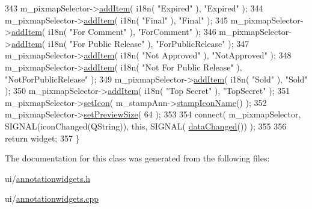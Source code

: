 \begin{DoxyCode}
343     m\_pixmapSelector->\hyperlink{classPixmapPreviewSelector_ac4729c46cc585aba462dd2eebcb74a92}{addItem}( i18n( \textcolor{stringliteral}{"Expired"} ), \textcolor{stringliteral}{"Expired"} );
344     m\_pixmapSelector->\hyperlink{classPixmapPreviewSelector_ac4729c46cc585aba462dd2eebcb74a92}{addItem}( i18n( \textcolor{stringliteral}{"Final"} ), \textcolor{stringliteral}{"Final"} );
345     m\_pixmapSelector->\hyperlink{classPixmapPreviewSelector_ac4729c46cc585aba462dd2eebcb74a92}{addItem}( i18n( \textcolor{stringliteral}{"For Comment"} ), \textcolor{stringliteral}{"ForComment"} );
346     m\_pixmapSelector->\hyperlink{classPixmapPreviewSelector_ac4729c46cc585aba462dd2eebcb74a92}{addItem}( i18n( \textcolor{stringliteral}{"For Public Release"} ), \textcolor{stringliteral}{"ForPublicRelease"} );
347     m\_pixmapSelector->\hyperlink{classPixmapPreviewSelector_ac4729c46cc585aba462dd2eebcb74a92}{addItem}( i18n( \textcolor{stringliteral}{"Not Approved"} ), \textcolor{stringliteral}{"NotApproved"} );
348     m\_pixmapSelector->\hyperlink{classPixmapPreviewSelector_ac4729c46cc585aba462dd2eebcb74a92}{addItem}( i18n( \textcolor{stringliteral}{"Not For Public Release"} ), \textcolor{stringliteral}{"NotForPublicRelease"} );
349     m\_pixmapSelector->\hyperlink{classPixmapPreviewSelector_ac4729c46cc585aba462dd2eebcb74a92}{addItem}( i18n( \textcolor{stringliteral}{"Sold"} ), \textcolor{stringliteral}{"Sold"} );
350     m\_pixmapSelector->\hyperlink{classPixmapPreviewSelector_ac4729c46cc585aba462dd2eebcb74a92}{addItem}( i18n( \textcolor{stringliteral}{"Top Secret"} ), \textcolor{stringliteral}{"TopSecret"} );
351     m\_pixmapSelector->\hyperlink{classPixmapPreviewSelector_a9ba6710637ffc9b0f5c8eac83aaec671}{setIcon}( m\_stampAnn->\hyperlink{classOkular_1_1StampAnnotation_a444978f06c11e4f74fbf1653555b4170}{stampIconName}() );
352     m\_pixmapSelector->\hyperlink{classPixmapPreviewSelector_a8fbaac78a3711252429b803d4351a4a3}{setPreviewSize}( 64 );
353 
354     connect( m\_pixmapSelector, SIGNAL(iconChanged(QString)), \textcolor{keyword}{this}, SIGNAL(
      \hyperlink{classAnnotationWidget_af9dcb02a8b69a602225c9844b5deb6d4}{dataChanged}()) );
355 
356     \textcolor{keywordflow}{return} widget;
357 \}
\end{DoxyCode}


The documentation for this class was generated from the following files\+:\begin{DoxyCompactItemize}
\item 
ui/\hyperlink{annotationwidgets_8h}{annotationwidgets.\+h}\item 
ui/\hyperlink{annotationwidgets_8cpp}{annotationwidgets.\+cpp}\end{DoxyCompactItemize}
